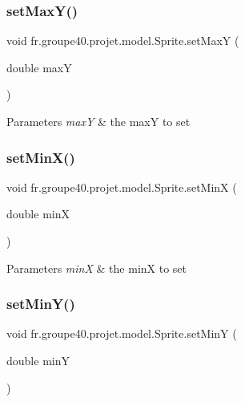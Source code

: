 \subsubsection{\texorpdfstring{set\+Max\+Y()}{setMaxY()}}
{\footnotesize\ttfamily void fr.\+groupe40.\+projet.\+model.\+Sprite.\+set\+MaxY (\begin{DoxyParamCaption}\item[{double}]{maxY }\end{DoxyParamCaption})}


\begin{DoxyParams}{Parameters}
{\em maxY} & the maxY to set \\
\hline
\end{DoxyParams}
\mbox{\label{classfr_1_1groupe40_1_1projet_1_1model_1_1_sprite_a41cb9d59bc9711494a898f6a6ffca6a1}} 
\subsubsection{\texorpdfstring{set\+Min\+X()}{setMinX()}}
{\footnotesize\ttfamily void fr.\+groupe40.\+projet.\+model.\+Sprite.\+set\+MinX (\begin{DoxyParamCaption}\item[{double}]{minX }\end{DoxyParamCaption})}


\begin{DoxyParams}{Parameters}
{\em minX} & the minX to set \\
\hline
\end{DoxyParams}
\mbox{\label{classfr_1_1groupe40_1_1projet_1_1model_1_1_sprite_af3554a7ce1504869fecf6170e62996ab}} 
\subsubsection{\texorpdfstring{set\+Min\+Y()}{setMinY()}}
{\footnotesize\ttfamily void fr.\+groupe40.\+projet.\+model.\+Sprite.\+set\+MinY (\begin{DoxyParamCaption}\item[{double}]{minY }\end{DoxyParamCaption})}


